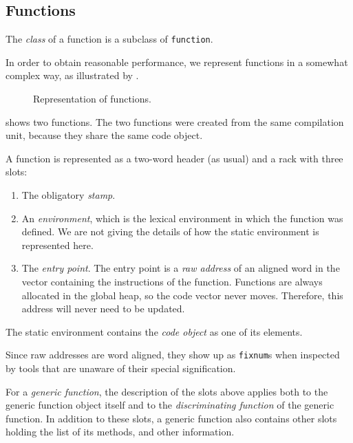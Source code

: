 \subsection{Functions}
\label{sec-data-representation-functions}

The \emph{class} of a function is a subclass of \texttt{function}.

In order to obtain reasonable performance, we represent functions in a
somewhat complex way, as illustrated by
.

\begin{figure}
\begin{center}
\end{center}
\caption{\label{fig-function-representation}
Representation of functions.}
\end{figure}

 shows two functions.  The two
functions were created from the same compilation unit, because they
share the same code object. 

A function is represented as a two-word header (as usual) and a
rack with three slots:

\begin{enumerate}
\item The obligatory \emph{stamp}.
\item An \emph{environment}, which is the lexical environment in which
  the function was defined.  We are not giving the details of how the
  static environment is represented here.
\item The \emph{entry point}.  The entry
  point is a \emph{raw address} of an aligned word in the vector
  containing the instructions of the function.  Functions are always
  allocated in the global heap, so the code vector never moves.
  Therefore, this address will never need to be updated.
\end{enumerate}

The static environment contains the \emph{code object} as one of its
elements.

Since raw addresses are word aligned, they show up as \texttt{fixnum}s
when inspected by tools that are unaware of their special
signification.

For a \emph{generic function}, the description of the slots above
applies both to the generic function object itself and to the
\emph{discriminating function} of the generic function.  In addition
to these slots, a generic function also contains other slots holding
the list of its methods, and other information.


